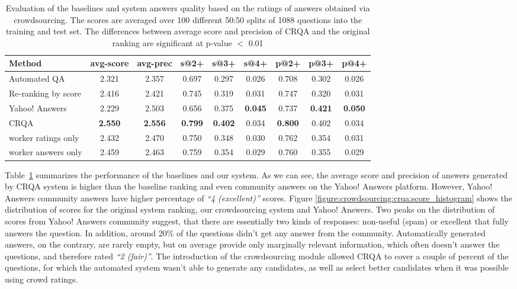 \begin{table}[ht]
\centering
\begin{tabular}{| p{4.2cm} | c | c | c | c | c | c | c | c |}
\hline
Method & avg-score & avg-prec & s@2+ & s@3+ & s@4+ & p@2+ & p@3+ & p@4+ \\
\hline
Automated QA & 2.321 & 2.357 & 0.697 & 0.297 & 0.026 & 0.708 & 0.302 & 0.026 \\
Re-ranking by score & 2.416 & 2.421 & 0.745 & 0.319 & 0.031 & 0.747 & 0.320 & 0.031 \\
Yahoo! Answers & 2.229 & 2.503 & 0.656 & 0.375 & \textbf{0.045} & 0.737 & \textbf{0.421} & \textbf{0.050} \\
CRQA & \textbf{2.550} & \textbf{2.556} & \textbf{0.799} & \textbf{0.402} & 0.034 & \textbf{0.800} & 0.402 & 0.034 \\
\hspace{5mm}worker ratings only & 2.432 & 2.470 & 0.750 & 0.348 & 0.030 & 0.762 & 0.354 & 0.031 \\
\hspace{5mm}worker answers only & 2.459 & 2.463 & 0.759 & 0.354 & 0.029 & 0.760 & 0.355 & 0.029 \\
\hline
\end{tabular}
\caption{Evaluation of the baselines and system answers quality based on the ratings of answers obtained via crowdsourcing. The scores are averaged over 100 different 50:50 splits of 1088 questions into the training and test set. The differences between average score and precision of CRQA and the original ranking are significant at p-value $<$ 0.01}
\label{table:crowdsourcing:crqa:performance}
\end{table}

Table~\ref{table:crowdsourcing:crqa:performance} summarizes the performance of the baselines and our system.
As we can see, the average score and precision of answers generated by CRQA system is higher than the baseline ranking and even community answers on the Yahoo! Answers platform.
However, Yahoo! Answers community answers have higher percentage of \textit{``4 (excellent)''} scores.
Figure \ref{figure:crowdsourcing:crqa:score_histogram} shows the distribution of scores for the original system ranking, our crowdsourcing system and Yahoo! Answers.
Two peaks on the distribution of scores from Yahoo! Answers community suggest, that there are essentially two kinds of responses: non-useful (\eg spam) or excellent that fully answers the question.
In addition, around 20\% of the questions didn't get any answer from the community.
Automatically generated answers, on the contrary, are rarely empty, but on average provide only marginally relevant information, which often doesn't answer the questions, and therefore rated \textit{``2 (fair)''}.
The introduction of the crowdsourcing module allowed CRQA to cover a couple of percent of the questions, for which the automated system wasn't able to generate any candidates, as well as select better candidates when it was possible using crowd ratings.

